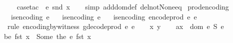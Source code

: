 \begin{isabellebody}
\ \ \ \isamarkupfalse%
\ {\isacharparenleft}{\kern0pt}case{\isacharunderscore}{\kern0pt}tac\ {\isacharbrackleft}{\kern0pt}{\isacharbang}{\kern0pt}{\isacharbrackright}{\kern0pt}\ {\isachardoublequoteopen}e{}\ {\isacharparenleft}{\kern0pt}snd\ x{\isacharparenright}{\kern0pt}{\isachardoublequoteclose}{\isacharparenright}{\kern0pt}\isanewline
\ \ \isamarkupfalse%
\ {\isacharparenleft}{\kern0pt}simp\ add{\isacharcolon}{\kern0pt}dom{\isacharunderscore}{\kern0pt}def\ del{\isacharcolon}{\kern0pt}not{\isacharunderscore}{\kern0pt}None{\isacharunderscore}{\kern0pt}eq{\isacharparenright}{\kern0pt}{\isacharplus}{\kern0pt}%
\endisatagproof
{\isafoldproof}%
%
\isadelimproof
\isanewline
%
\endisadelimproof
\isanewline
{}\isamarkupfalse%
\ prod{\isacharunderscore}{\kern0pt}encoding{\isacharcolon}{\kern0pt}\isanewline
\ \ \ {\isachardoublequoteopen}is{\isacharunderscore}{\kern0pt}encoding\ e{}{\isachardoublequoteclose}\isanewline
\ \ \ {\isachardoublequoteopen}is{\isacharunderscore}{\kern0pt}encoding\ e{}{\isachardoublequoteclose}\isanewline
\ \ \ {\isachardoublequoteopen}is{\isacharunderscore}{\kern0pt}encoding\ {\isacharparenleft}{\kern0pt}encode{\isacharunderscore}{\kern0pt}prod\ e{}\ e{}{\isacharparenright}{\kern0pt}{\isachardoublequoteclose}\isanewline
%
\isadelimproof
%
\endisadelimproof
%
\isatagproof
{}\isamarkupfalse%
\ \ {\isacharparenleft}{\kern0pt}rule\ encoding{\isacharunderscore}{\kern0pt}by{\isacharunderscore}{\kern0pt}witness{\isacharbrackleft}{\kern0pt}\ g{\isacharequal}{\kern0pt}{\isachardoublequoteopen}decode{\isacharunderscore}{\kern0pt}prod\ e{}\ e{}{\isachardoublequoteclose}{\isacharbrackright}{\kern0pt}{\isacharparenright}{\kern0pt}\isanewline
\ \ \isamarkupfalse%
\ x\ y\isanewline
\ \ \isamarkupfalse%
\ a{\isacharcolon}{\kern0pt}{\isachardoublequoteopen}x\ {\isasymin}\ dom\ {\isacharparenleft}{\kern0pt}e{}\ {\isasymtimes}\isactrlsub S\ e{}{\isacharparenright}{\kern0pt}{\isachardoublequoteclose}\isanewline
\isanewline
\ \ \isamarkupfalse%
\ b{\isacharcolon}{\kern0pt}{\isachardoublequoteopen}e{}\ {\isacharparenleft}{\kern0pt}fst\ x{\isacharparenright}{\kern0pt}\ {\isacharequal}{\kern0pt}\ Some\ {\isacharparenleft}{\kern0pt}the\ {\isacharparenleft}{\kern0pt}e{}\ {\isacharparenleft}{\kern0pt}fst\ x{\isacharparenright}{\kern0pt}{\isacharparenright}{\kern0pt}{\isacharparenright}{\kern0pt}{\isachardoublequoteclose}\isanewline

\end{isabellebody}
